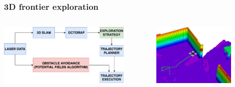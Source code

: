 
\begin{frame}
	\frametitle{3D frontier exploration}
	\begin{columns}
		\begin{column}{0.5\textwidth}\centering
			\begin{center}
				\includegraphics[height=3cm]{figures/3D_strategy}
				\label{fig:forest_uav}
			\end{center}
		\end{column}
		\begin{column}{0.5\textwidth}\centering
			\begin{center}
				\includegraphics[height=3cm]{figures/octomap_and_drone}
				\label{fig:forest_plc}
			\end{center}
		\end{column}
	\end{columns}
\end{frame}